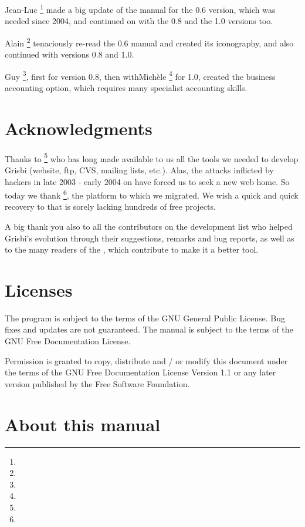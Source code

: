 {Jean-Luc } \footnote{ \urlJeanLucDuflotEmail{}} made a big update of the manual for the 0.6 version, which was needed since 2004, and continued on with the 0.8 and the 1.0 versions too.

{Alain } \footnote{ \urlAlainLetientEmail{}} tenaciously re-read the 0.6 manual and created its iconography, and also continued with versions 0.8 and 1.0.

{Guy } \footnote{ \urlGuyLebegueEmail{}}, first for version 0.8, then with{Michèle} \footnote{ \urlMicheleBondilEmail{}} for 1.0, created the business accounting option, which requires many specialist accounting skills.

\section{Acknowledgments \label{introduction-thanks}}

Thanks to  \footnote{ \urlTuxFamily{}} who has long made available to us all the tools we needed to develop Grisbi 
(website, ftp, CVS, mailing lists, etc.). Alas, the attacks inflicted by hackers in late 2003 - early 2004 on  have forced us to seek a new web home. So today we thank  \footnote{ \urlSourceForge{}}, the platform to which we migrated.  We wish a quick and quick recovery to  that is sorely lacking hundreds of free projects.

A big thank you also to all the contributors on the development list who helped Grisbi's evolution through their suggestions, remarks and bug reports, as well as to the many readers of the , which contribute to make it a better tool.

\section{Licenses \label{introduction-licenses}}

The program is subject to the terms of the \gls{GNU General Public License}.  Bug fixes and updates are not guaranteed.  The manual is subject to the terms of the \gls{GNU Free Documentation License}.

Permission is granted to copy, distribute and / or modify this document under the terms of the GNU Free Documentation License Version 1.1 or any later version published by the Free Software Foundation.

\section{About this manual \label{introduction-manual}}

